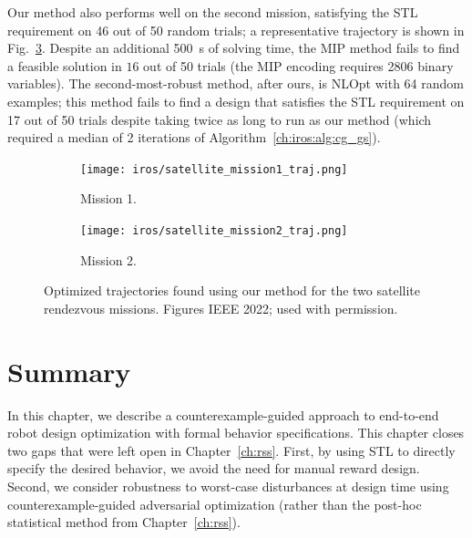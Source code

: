 Our method also performs well on the second mission, satisfying the STL requirement on 46 out of 50 random trials; a representative trajectory is shown in Fig.~\ref{ch:iros:fig:mission_2_traj}. Despite an additional \SI{500}{s} of solving time, the MIP method fails to find a feasible solution in $16$ out of 50 trials (the MIP encoding requires 2806 binary variables). The second-most-robust method, after ours, is NLOpt with 64 random examples; this method fails to find a design that satisfies the STL requirement on 17 out of 50 trials despite taking twice as long to run as our method (which required a median of 2 iterations of Algorithm~\ref{ch:iros:alg:cg_gs}).

\begin{figure}[tbh]
    \centering
    \begin{subfigure}[b]{0.45\linewidth}
        \centering
        \texttt{[image: iros/satellite\_mission1\_traj.png]}
        \caption{Mission 1.}
        \label{ch:iros:fig:mission_1_traj}
    \end{subfigure}
    \quad
    \begin{subfigure}[b]{0.45\linewidth}
        \centering
        \texttt{[image: iros/satellite\_mission2\_traj.png]}
        \caption{Mission 2.}
        \label{ch:iros:fig:mission_2_traj}
    \end{subfigure}
    \caption{Optimized trajectories found using our method for the two satellite rendezvous missions. Figures \textcopyright{} IEEE 2022; used with permission.}
\end{figure}

\section{Summary}

In this chapter, we describe a counterexample-guided approach to end-to-end robot design optimization with formal behavior specifications. This chapter closes two gaps that were left open in Chapter~\ref{ch:rss}. First, by using STL to directly specify the desired behavior, we avoid the need for manual reward design. Second, we consider robustness to worst-case disturbances at design time using counterexample-guided adversarial optimization (rather than the post-hoc statistical method from Chapter~\ref{ch:rss}).

